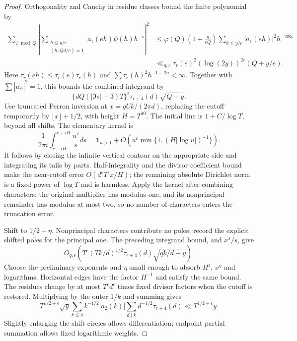 \begin{proof}
Orthogonality and Cauchy in residue classes bound the finite polynomial
by
\begin{align*}
 \sum_{\psi\bmod Q}\left|
 \sum_{\substack{h\le y/e\\(h,Qd/e)=1}}
       a_1(eh)\psi(h)h^{-s}\right|^2
 &\le\varphi(Q)\left(1+\frac y{eQ}\right)
                      \sum_{h\le y/e}|a_1(eh)|^2h^{-2\Re s}\\
 &\ll_{\eta,r}\tau_r(e)^2(\log(2y))^{2r}(Q+y/e).
\end{align*}
Here $\tau_r(eh)\le\tau_r(e)\tau_r(h)$ and
$\sum\tau_r(h)^2h^{-1-2\eta}<\infty$. Together with
$\sum|u_\psi|^2=1$, this bounds the combined integrand by
\[
 \{dQ(|\Im s|+3)T\}^\epsilon\tau_{r+4}(d)\sqrt{Q+y}.
\]
Use truncated Perron inversion at $x=qUk/(2\pi d)$, replacing the
cutoff temporarily by $\lfloor x\rfloor+1/2$, with height $H=T^{10}$.
The initial line is $1+C/\log T$, beyond all shifts. The elementary
kernel is
\[
 \frac1{2\pi i}\int_{c-iH}^{c+iH}\frac{u^s}{s}ds
 =\mathbf1_{u>1}+O\left(u^c\min\{1,(H|\log u|)^{-1}\}\right).
\]
It follows by closing the infinite vertical contour on the appropriate
side and integrating its tails by parts. Half-integrality and the
divisor coefficient bound make the near-cutoff error
$O(d^\epsilon T^\epsilon x/H)$; the remaining absolute Dirichlet
norm is a fixed power of $\log T$ and is harmless. Apply the kernel
after combining characters: the original multiplier has modulus one,
and its nonprincipal remainder has modulus at most two, so no number
of characters enters the truncation error.

Shift to $1/2+\eta$. Nonprincipal characters contribute no poles;
record the explicit shifted poles for the principal one. The preceding
integrand bound, and $x^s/s$, give
\[
 O_{q,\epsilon}\left(T^\epsilon(Tk/d)^{1/2}
                       \tau_{r+4}(d)\sqrt{qk/d+y}\right).
\]
Choose the preliminary exponents and $\eta$ small enough to absorb
$H^\epsilon$, $x^\eta$ and logarithms. Horizontal edges have the
factor $H^{-1}$ and satisfy the same bound. The residues change by
at most $T^\epsilon d^\epsilon$ times fixed divisor factors when the
cutoff is restored. Multiplying by the outer $1/k$ and summing gives
\[
 T^{1/2+\epsilon}\sqrt y\sum_{k\le y}k^{-1/2}|a_2(k)|
                         \sum_{d\mid k}d^{-1/2}\tau_{r+4}(d)
 \ll T^{1/2+\epsilon}y.
\]
Slightly enlarging the shift circles allows differentiation; endpoint
partial summation allows fixed logarithmic weights.
\end{proof}

